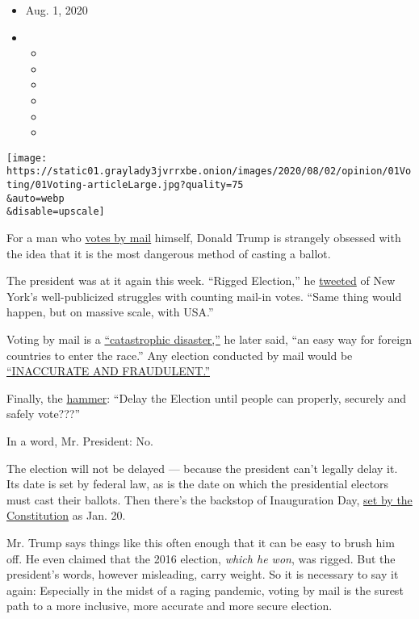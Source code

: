 \begin{itemize}
\item
  Aug. 1, 2020
\item
  \begin{itemize}
  \item
  \item
  \item
  \item
  \item
  \item
  \end{itemize}
\end{itemize}

\texttt{[image: https://static01.graylady3jvrrxbe.onion/images/2020/08/02/opinion/01Voting/01Voting-articleLarge.jpg?quality=75\\\&auto=webp\\\&disable=upscale]}

For a man who
\href{https://www.nytimes3xbfgragh.onion/2020/08/03/us/politics/trump-mail-in-voting.html}{votes
by mail} himself, Donald Trump is strangely obsessed with the idea that
it is the most dangerous method of casting a ballot.

The president was at it again this week. ``Rigged Election,'' he
\href{https://twitter.com/realDonaldTrump/status/1288602262567153664}{tweeted}
of New York's well-publicized struggles with counting mail-in votes.
``Same thing would happen, but on massive scale, with USA.''

Voting by mail is a
\href{https://twitter.com/realDonaldTrump/status/1288809157722877952}{``catastrophic
disaster,''} he later said, ``an easy way for foreign countries to enter
the race.'' Any election conducted by mail would be
\href{https://twitter.com/realDonaldTrump/status/1288818160389558273}{``INACCURATE
AND FRAUDULENT.''}

Finally, the
\href{https://twitter.com/realDonaldTrump/status/1288818160389558273}{hammer}:
``Delay the Election until people can properly, securely and safely
vote???''

In a word, Mr. President: No.

The election will not be delayed --- because the president can't legally
delay it. Its date is set by federal law, as is the date on which the
presidential electors must cast their ballots. Then there's the backstop
of Inauguration Day,
\href{https://constitutioncenter.org/interactive-constitution/amendment/amendment-xx}{set
by the Constitution} as Jan. 20.

Mr. Trump says things like this often enough that it can be easy to
brush him off. He even claimed that the 2016 election, \emph{which he
won}, was rigged. But the president's words, however misleading, carry
weight. So it is necessary to say it again: Especially in the midst of a
raging pandemic, voting by mail is the surest path to a more inclusive,
more accurate and more secure election.

